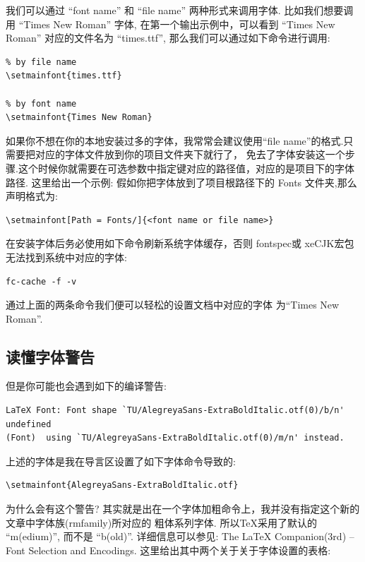 我们可以通过 ``font name'' 和  ``file name'' 两种形式来调用字体. 比如我们想要调用 ``Times New Roman'' 字体,
在第一个输出示例中，可以看到 ``Times New Roman'' 对应的文件名为 ``times.ttf'', 那么我们可以通过如下命令进行调用:
\begin{verbatim}
% by file name 
\setmainfont{times.ttf}

% by font name
\setmainfont{Times New Roman}
\end{verbatim}

\begin{remark}
如果你不想在你的本地安装过多的字体，我常常会建议使用``file name''的格式.只需要把对应的字体文件放到你的项目文件夹下就行了，
免去了字体安装这一个步骤.这个时候你就需要在可选参数中指定键对应的路径值，对应的是项目下的字体路径. 这里给出一个示例:
假如你把字体放到了项目根路径下的 {Fonts} 文件夹,那么声明格式为:
\end{remark}
\begin{verbatim}
\setmainfont[Path = Fonts/]{<font name or file name>}
\end{verbatim}

在安装字体后务必使用如下命令刷新系统字体缓存，否则 {fontspec}或 {xeCJK}宏包无法找到系统中对应的字体:
\begin{verbatim}
fc-cache -f -v
\end{verbatim}

通过上面的两条命令我们便可以轻松的设置文档中对应的字体
为``Times New Roman''.

\subsection{读懂字体警告}
但是你可能也会遇到如下的编译警告:
\begin{verbatim}
LaTeX Font: Font shape `TU/AlegreyaSans-ExtraBoldItalic.otf(0)/b/n' undefined
(Font)	using `TU/AlegreyaSans-ExtraBoldItalic.otf(0)/m/n' instead.
\end{verbatim}

上述的字体是我在导言区设置了如下字体命令导致的:
\begin{verbatim}
\setmainfont{AlegreyaSans-ExtraBoldItalic.otf}
\end{verbatim}

为什么会有这个警告? 其实就是出在一个字体加粗命令\cmd{\textbf}上，我并没有指定这个新的文章中字体族(rmfamily)所对应的
粗体系列字体. 所以\TeX{}采用了默认的 ``m(edium)'', 而不是 ``b(old)''. 详细信息可以参见\cite{goossens1994latex}:
The \LaTeX{} Companion(3rd) -- Font Selection and Encodings. 这里给出其中两个关于关于字体设置的表格:

